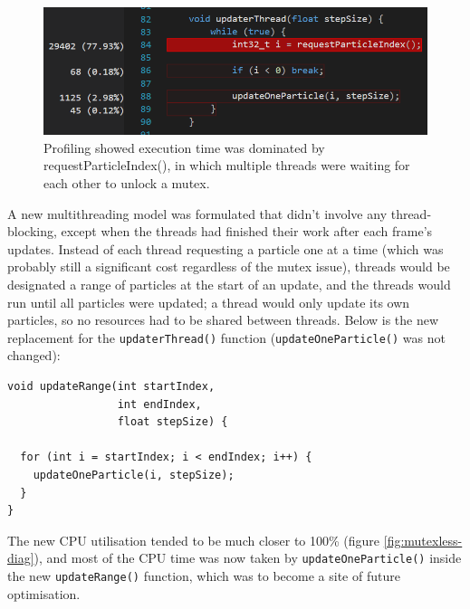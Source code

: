 \documentclass[11pt, a4paper, twocolumn]{article}
\begin{document}
\begin{figure}[h]
\includegraphics[width=\linewidth]{updaterthread-request}
\caption{Profiling showed execution time was dominated by requestParticleIndex(), in which multiple threads were waiting for each other to unlock a mutex.}
\label{fig:updaterthread-request}
\end{figure}

A new multithreading model was formulated that didn't involve any thread-blocking, except when the threads had finished their work after each frame's updates. Instead of each thread requesting a particle one at a time (which was probably still a significant cost regardless of the mutex issue), threads would be designated a range of particles at the start of an update, and the threads would run until all particles were updated; a thread would only update its own particles, so no resources had to be shared between threads. Below is the new replacement for the \verb|updaterThread()| function (\verb|updateOneParticle()| was not changed):

\begin{verbatim}
void updateRange(int startIndex,
                 int endIndex,
                 float stepSize) {
  
  for (int i = startIndex; i < endIndex; i++) {
    updateOneParticle(i, stepSize);
  }
}
\end{verbatim}

The new CPU utilisation tended to be much closer to 100\% (figure \ref{fig:mutexless-diag}), and most of the CPU time was now taken by \verb|updateOneParticle()| inside the new \verb|updateRange()| function, which was to become a site of future optimisation.
\end{document}
